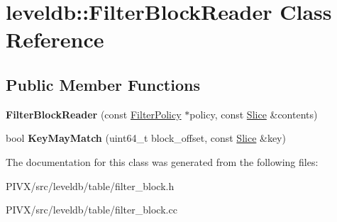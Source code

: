 \hypertarget{classleveldb_1_1_filter_block_reader}{}\section{leveldb\+:\+:Filter\+Block\+Reader Class Reference}
\label{classleveldb_1_1_filter_block_reader}
\subsection*{Public Member Functions}
\begin{DoxyCompactItemize}
\item 
\mbox{\label{classleveldb_1_1_filter_block_reader_a02e9203af5314959ad99057f0020c406}} 
{\bfseries Filter\+Block\+Reader} (const \mbox{\hyperlink{classleveldb_1_1_filter_policy}{Filter\+Policy}} $\ast$policy, const \mbox{\hyperlink{classleveldb_1_1_slice}{Slice}} \&contents)
\item 
\mbox{\label{classleveldb_1_1_filter_block_reader_a2c1c0cd8311b99fd92d3548b7aa240d0}} 
bool {\bfseries Key\+May\+Match} (uint64\+\_\+t block\+\_\+offset, const \mbox{\hyperlink{classleveldb_1_1_slice}{Slice}} \&key)
\end{DoxyCompactItemize}


The documentation for this class was generated from the following files\+:\begin{DoxyCompactItemize}
\item 
P\+I\+V\+X/src/leveldb/table/filter\+\_\+block.\+h\item 
P\+I\+V\+X/src/leveldb/table/filter\+\_\+block.\+cc\end{DoxyCompactItemize}
